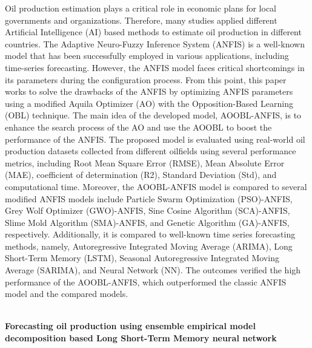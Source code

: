 Oil production estimation plays a critical role in economic plans for local governments and organizations. Therefore, many studies applied different Artificial Intelligence (AI) based methods to estimate oil production in different countries. The Adaptive Neuro-Fuzzy Inference System (ANFIS) is a well-known model that has been successfully employed in various applications, including time-series forecasting. However, the ANFIS model faces critical shortcomings in its parameters during the configuration process. From this point, this paper works to solve the drawbacks of the ANFIS by optimizing ANFIS parameters using a modified Aquila Optimizer (AO) with the Opposition-Based Learning (OBL) technique. The main idea of the developed model, AOOBL-ANFIS, is to enhance the search process of the AO and use the AOOBL to boost the performance of the ANFIS. The proposed model is evaluated using real-world oil production datasets collected from different oilfields using several performance metrics, including Root Mean Square Error (RMSE), Mean Absolute Error (MAE), coefficient of determination (R2), Standard Deviation (Std), and computational time. Moreover, the AOOBL-ANFIS model is compared to several modified ANFIS models include Particle Swarm Optimization (PSO)-ANFIS, Grey Wolf Optimizer (GWO)-ANFIS, Sine Cosine Algorithm (SCA)-ANFIS, Slime Mold Algorithm (SMA)-ANFIS, and Genetic Algorithm (GA)-ANFIS, respectively. Additionally, it is compared to well-known time series forecasting methods, namely, Autoregressive Integrated Moving Average (ARIMA), Long Short-Term Memory (LSTM), Seasonal Autoregressive Integrated Moving Average (SARIMA), and Neural Network (NN). The outcomes verified the high performance of the AOOBL-ANFIS, which outperformed the classic ANFIS model and the compared models.

\\

\textbf{Forecasting oil production using ensemble empirical model decomposition based Long Short-Term Memory neural network}

